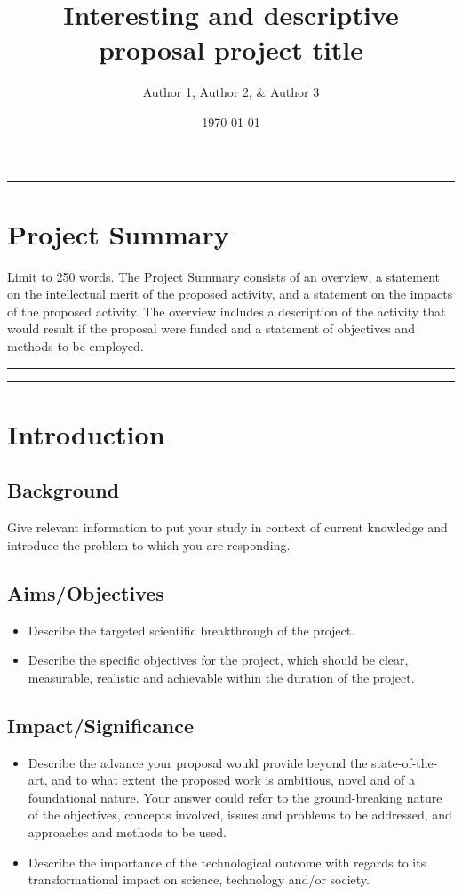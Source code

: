 \documentclass[11pt]{article} %
\title{Interesting and descriptive proposal project title}
\date{\today}
\author{Author 1, Author 2, \& Author 3}
\begin{document}

\maketitle %


\noindent\rule{\linewidth}{\arrayrulewidth}

\section*{Project Summary}
Limit to 250 words. The Project
Summary consists of an overview, a statement on the intellectual merit of the proposed activity, and a statement
on the impacts of the proposed activity.
The overview includes a description of the activity that would result if the proposal were funded and a statement
of objectives and methods to be employed. 

\noindent\rule{\linewidth}{\arrayrulewidth}

\clearpage
\tableofcontents
\noindent\rule{\linewidth}{\arrayrulewidth}


\section{Introduction}
\subsection{Background}
Give relevant information to put your study in context of current knowledge and introduce the problem to which you are responding.

\subsection{Aims/Objectives}
\begin{itemize}
\item Describe the targeted scientific breakthrough of the project.
\item Describe the specific objectives for the project, which should be clear, measurable, realistic and achievable within the duration of the project.
\end{itemize}

\subsection{Impact/Significance}
\begin{itemize}
\item Describe the advance your proposal would provide beyond the state-of-the-art, and to what extent the proposed work is ambitious, novel and of a foundational nature. Your answer could refer to the ground-breaking nature of the objectives, concepts involved, issues and problems to be addressed, and approaches and methods to be used. 
\item Describe the importance of the technological outcome with regards to its transformational impact on science, technology and/or society.
\end{itemize}
\end{document}
